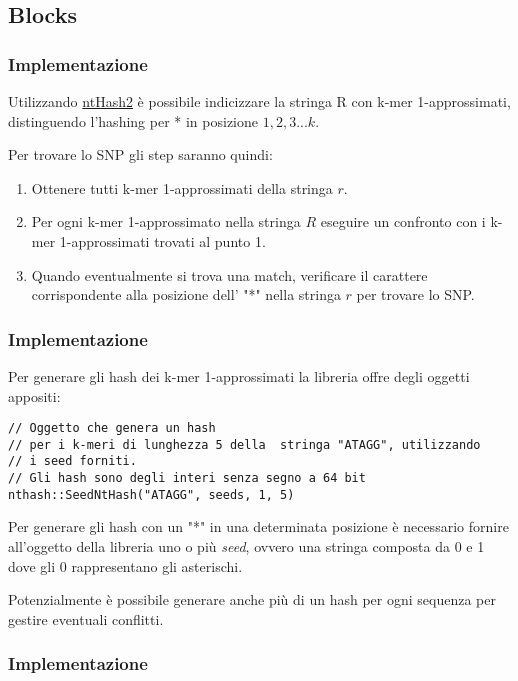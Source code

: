 \documentclass[
	11pt, %
]{beamer}
\begin{document}

\subsection{Blocks}

\begin{frame}
	\frametitle{Implementazione}
	
	Utilizzando  \href{https://github.com/bcgsc/ntHash}{ntHash2} è possibile indicizzare la stringa R con k-mer 1-approssimati, distinguendo l'hashing per * in posizione $1,2,3...k$.
	
	Per trovare lo SNP gli step saranno quindi:
\begin{enumerate} 
	\item	Ottenere tutti k-mer 1-approssimati della stringa $r$.
	\item  Per ogni k-mer 1-approssimato nella stringa $R$ eseguire un confronto con i k-mer 1-approssimati trovati al punto 1.
	\item Quando eventualmente si trova una match, verificare il carattere corrispondente alla posizione dell' "*" nella stringa $r$ per trovare lo SNP.
\end{enumerate}
	

\end{frame}


\begin{frame}[fragile]
	\frametitle{Implementazione}
	Per generare gli hash dei k-mer 1-approssimati la libreria offre degli oggetti appositi:
	
\begin{lstlisting}
// Oggetto che genera un hash
// per i k-meri di lunghezza 5 della  stringa "ATAGG", utilizzando
// i seed forniti.
// Gli hash sono degli interi senza segno a 64 bit
nthash::SeedNtHash("ATAGG", seeds, 1, 5)
\end{lstlisting}
	
	Per generare gli hash con un "*" in una determinata posizione è necessario fornire all'oggetto della libreria uno o più \textit{seed},  ovvero una stringa composta da 0 e 1 dove gli 0 rappresentano gli asterischi.
	
	Potenzialmente è possibile generare anche più di un hash per ogni sequenza per gestire eventuali conflitti.
	
\end{frame}
\begin{frame}[fragile]
	\frametitle{Implementazione}
	
	
\end{frame}

\end{document}
